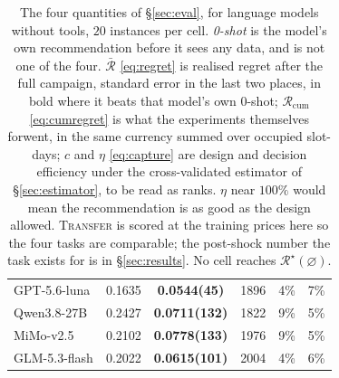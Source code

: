 \begin{table}[t]
\begin{tabular}{@{}lccccc@{}}
GPT-5.6-luna & 0.1635 & \textbf{0.0544(45)} & 1896 & 4\% & 7\% \\
Qwen3.8-27B & 0.2427 & \textbf{0.0711(132)} & 1822 & 9\% & 5\% \\
MiMo-v2.5 & 0.2102 & \textbf{0.0778(133)} & 1976 & 9\% & 5\% \\
GLM-5.3-flash & 0.2022 & \textbf{0.0615(101)} & 2004 & 4\% & 6\% \\
\bottomrule
\end{tabular}
\caption{The four quantities of \S\ref{sec:eval}, for language models without tools, $20$ instances per cell. \emph{0-shot} is the model's own recommendation before it sees any data, and is not one of the four. $\bar{\mathcal{R}}$ \eqref{eq:regret} is realised regret after the full campaign, standard error in the last two places, in bold where it beats that model's own 0-shot; $\mathcal{R}_{\mathrm{cum}}$ \eqref{eq:cumregret} is what the experiments themselves forwent, in the same currency summed over occupied slot-days; $c$ and $\eta$ \eqref{eq:capture} are design and decision efficiency under the cross-validated estimator of \S\ref{sec:estimator}, to be read as ranks. $\eta$ near $100\%$ would mean the recommendation is as good as the design allowed. \textsc{Transfer} is scored at the training prices here so the four tasks are comparable; the post-shock number the task exists for is in \S\ref{sec:results}. No cell reaches $\mathcal{R}^\star(\varnothing)$.}
\label{tab:results}
\end{table}
